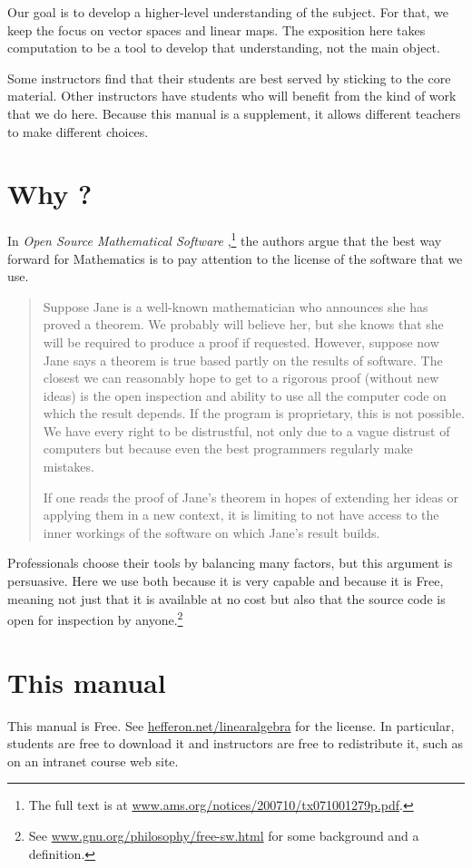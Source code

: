 Our goal is to develop a higher-level understanding of the subject. 
For that, we keep the focus on vector spaces and linear maps.
The exposition here takes computation to be
a tool to develop that understanding, not the main object.

Some instructors find that their students are best served by
sticking to the core material.
Other instructors
have students who will benefit from the kind of work that
we do here.
Because this manual is a supplement, it allows different 
teachers to make different choices.


\section{Why \Sage?}
In 
\textit{Open Source Mathematical Software} 
\citep{JoynerStein07},\footnote{The full text is at
\protect\url{www.ams.org/notices/200710/tx071001279p.pdf}.}
the authors argue that the best way forward for Mathematics 
is to pay attention to the license of the software that we use.

\begin{quotation}\small
Suppose Jane is a well-known mathematician who announces
she has proved a theorem. We probably will believe
her, but she knows that she will be required to produce
a proof if requested. However, suppose now Jane says a
theorem is true based partly on the results of software. The
closest we can reasonably hope to get to a rigorous proof
(without new ideas) is the open inspection and ability to use
all the computer code on which the result depends. If the
program is proprietary, this is not possible. We have every
right to be distrustful, not only due to a vague distrust of
computers but because even the best programmers regularly
make mistakes.

If one reads the proof of Jane’s theorem in hopes of
extending her ideas or applying them in a new context, it
is limiting to not have access to the inner workings of the
software on which Jane’s result builds.
\end{quotation}  
Professionals choose their tools by balancing many factors, but
this argument is persuasive.
Here we use \Sage{} both because it is very capable 
and because it is 
Free, meaning not just that it is available at no cost but also that the
source code is open for inspection by anyone.\footnote{See
\protect\url{www.gnu.org/philosophy/free-sw.html} 
for some background and a definition.} 



\section{This manual}
This manual is Free.
See
\url{hefferon.net/linearalgebra} for the license.
In particular, students are free to download it
and instructors are free to redistribute it, such
as on an intranet course web site.

